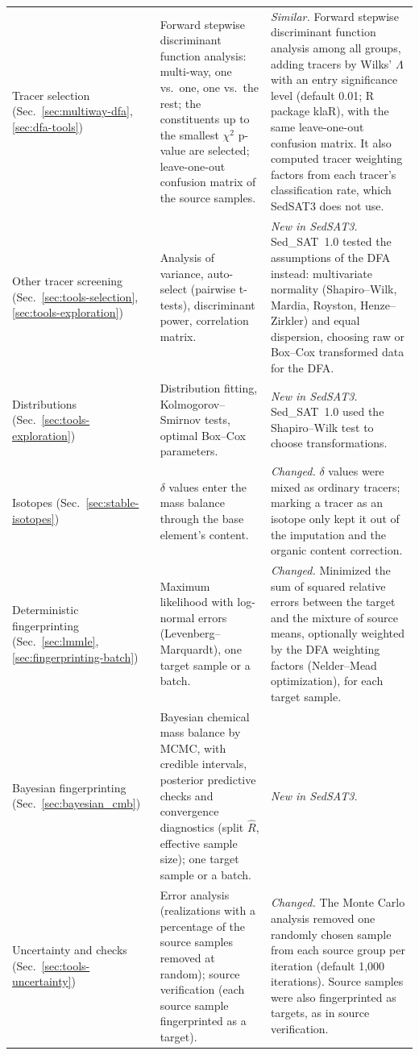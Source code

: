 \documentclass[12pt]{report}
\begin{document}
\begin{longtable}{>{\raggedright\arraybackslash}p{2.5cm}>{\raggedright\arraybackslash}p{5.0cm}>{\raggedright\arraybackslash}p{6.1cm}}
\addlinespace
Tracer selection (Sec.~\ref{sec:multiway-dfa}, \ref{sec:dfa-tools}) & Forward stepwise discriminant function analysis: multi-way, one vs.\ one, one vs.\ the rest; the constituents up to the smallest $\chi^2$ p-value are selected; leave-one-out confusion matrix of the source samples. & \textit{Similar.} Forward stepwise discriminant function analysis among all groups, adding tracers by Wilks' $\Lambda$ with an entry significance level (default 0.01; R package klaR), with the same leave-one-out confusion matrix. It also computed tracer weighting factors from each tracer's classification rate, which SedSAT3 does not use. \\
\addlinespace
Other tracer screening (Sec.~\ref{sec:tools-selection}, \ref{sec:tools-exploration}) & Analysis of variance, auto-select (pairwise t-tests), discriminant power, correlation matrix. & \textit{New in SedSAT3.} Sed\_SAT~1.0 tested the assumptions of the DFA instead: multivariate normality (Shapiro--Wilk, Mardia, Royston, Henze--Zirkler) and equal dispersion, choosing raw or Box--Cox transformed data for the DFA. \\
\addlinespace
Distributions (Sec.~\ref{sec:tools-exploration}) & Distribution fitting, Kolmogorov--Smirnov tests, optimal Box--Cox parameters. & \textit{New in SedSAT3.} Sed\_SAT~1.0 used the Shapiro--Wilk test to choose transformations. \\
\addlinespace
Isotopes (Sec.~\ref{sec:stable-isotopes}) & $\delta$ values enter the mass balance through the base element's content. & \textit{Changed.} $\delta$ values were mixed as ordinary tracers; marking a tracer as an isotope only kept it out of the imputation and the organic content correction. \\
\addlinespace
Deterministic fingerprinting (Sec.~\ref{sec:lmmle}, \ref{sec:fingerprinting-batch}) & Maximum likelihood with log-normal errors (Levenberg--Marquardt), one target sample or a batch. & \textit{Changed.} Minimized the sum of squared relative errors between the target and the mixture of source means, optionally weighted by the DFA weighting factors (Nelder--Mead optimization), for each target sample. \\
\addlinespace
Bayesian fingerprinting (Sec.~\ref{sec:bayesian_cmb}) & Bayesian chemical mass balance by MCMC, with credible intervals, posterior predictive checks and convergence diagnostics (split $\hat{R}$, effective sample size); one target sample or a batch. & \textit{New in SedSAT3.} \\
\addlinespace
Uncertainty and checks (Sec.~\ref{sec:tools-uncertainty}) & Error analysis (realizations with a percentage of the source samples removed at random); source verification (each source sample fingerprinted as a target). & \textit{Changed.} The Monte Carlo analysis removed one randomly chosen sample from each source group per iteration (default 1,000 iterations). Source samples were also fingerprinted as targets, as in source verification. \\

\end{longtable}
\end{document}

